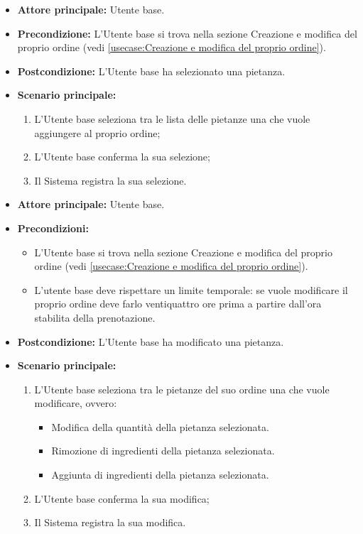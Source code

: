 \label{usecase:Selezione pietanza}
\begin{itemize}
	\item \textbf{Attore principale:} Utente base.

	\item \textbf{Precondizione:} L'Utente base si trova nella sezione Creazione e modifica del proprio ordine (vedi \autoref{usecase:Creazione e modifica del proprio ordine}).

	\item \textbf{Postcondizione:} L'Utente base ha selezionato una pietanza.

	\item \textbf{Scenario principale:}
	      \begin{enumerate}
		      \item L'Utente base seleziona tra le lista delle pietanze una che vuole aggiungere al proprio ordine;
		      \item L'Utente base conferma la sua selezione;
		      \item Il Sistema registra la sua selezione.
	      \end{enumerate}
\end{itemize}

\label{usecase:Modifica pietanza}
\begin{itemize}
	\item \textbf{Attore principale:} Utente base.

	\item \textbf{Precondizioni:} 
	\begin{itemize}
		\item L'Utente base si trova nella sezione Creazione e modifica del proprio ordine (vedi \autoref{usecase:Creazione e modifica del proprio ordine}).
		\item L'utente base deve rispettare un limite temporale: se vuole modificare il proprio ordine deve farlo ventiquattro ore prima a partire dall'ora stabilita della prenotazione.
	\end{itemize}

	\item \textbf{Postcondizione:} L'Utente base ha modificato una pietanza.

	\item \textbf{Scenario principale:}
	      \begin{enumerate}
		      \item L'Utente base seleziona tra le pietanze del suo ordine una che vuole modificare, ovvero:
		      \begin{itemize}
				\item Modifica della quantità della pietanza selezionata.
				\item Rimozione di ingredienti della pietanza selezionata.
				\item Aggiunta di ingredienti della pietanza selezionata.
			  \end{itemize}
		      \item L'Utente base conferma la sua modifica;
		      \item Il Sistema registra la sua modifica.
	      \end{enumerate}
\end{itemize}